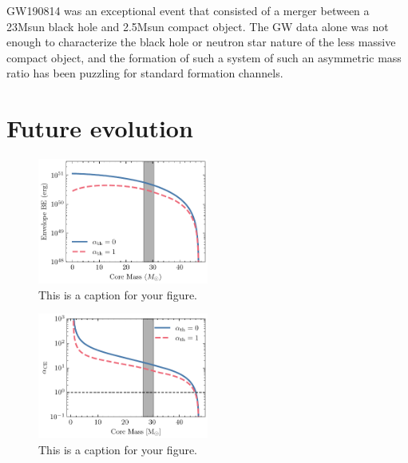 \documentclass[linenumbers,trackchanges,twocolumn]{aastex701}
\begin{document}
GW190814 was an exceptional event that consisted of a merger between a 23Msun black hole and 2.5Msun compact object. The GW data alone was not enough to characterize the black hole or neutron star nature of the less massive compact object, and the formation of such a system of such an asymmetric mass ratio has been puzzling for standard formation channels. 

\section{Future evolution}

\begin{figure}[htbp]
    \centering
    \includegraphics[width=0.5\textwidth]{xrb_be.pdf}
    \caption{This is a caption for your figure.}
    \label{fig:xrb_be}
\end{figure}

\begin{figure}[htbp]
    \centering
    \includegraphics[width=0.5\textwidth]{xrb_alpha_ce.pdf}
    \caption{This is a caption for your figure.}
    \label{fig:xrb_alpha_ce}
\end{figure}
\end{document}
